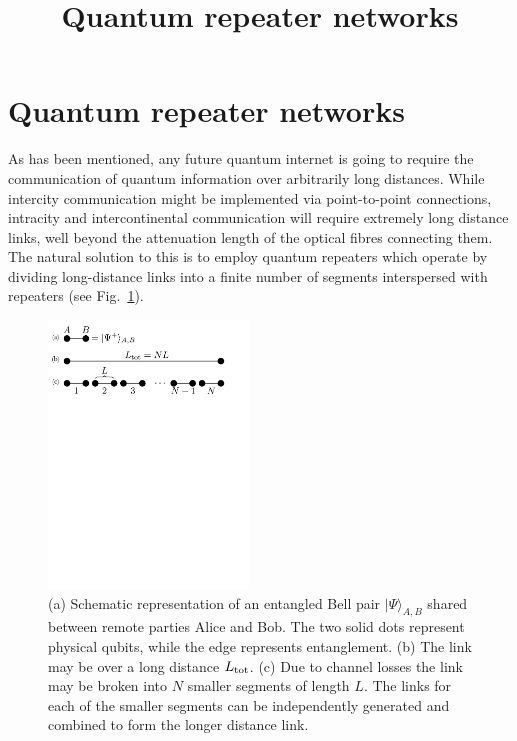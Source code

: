 \documentclass[twocolumn, aps, rmp, amsmath, amssymb, nofootinbib, superscriptaddress, longbibliography, floatfix, table-of-contents, eqsecnum]{revtex4-1}
\begin{document}
\title{Quantum repeater networks}

\maketitle

\section{Quantum repeater networks}

\tableofcontents 

As has been mentioned, any future quantum internet \cite{bib:Kimble2008} is going to require the communication of quantum information over arbitrarily long distances. While intercity communication might be implemented via point-to-point connections, intracity and intercontinental communication will require extremely long distance links, well beyond the attenuation length of the optical fibres connecting them. The natural solution to this is to employ quantum repeaters \cite{bib:Gisin2007, bib:SSRG09, bib:WJM2015} which operate by dividing long-distance links into a finite number of segments interspersed with repeaters (see Fig.~\ref{fig:repeaters_1}). 
\begin{figure}[!htb]
\includegraphics[width=0.475\textwidth]{repeaters_1}
\caption{(a) Schematic representation of an entangled Bell pair $| \Psi\rangle_{A,B}$ shared between remote parties Alice and Bob. The two solid dots represent physical qubits, while the edge represents entanglement. (b) The link may be over a long distance $L_{\rm tot}$. (c) Due to channel losses the link may be broken into $N$ smaller segments of length $L$. The links for each of the smaller segments can be independently generated and combined to form the longer distance link.} 
\label{fig:repeaters_1}
\end{figure} 
\end{document}
